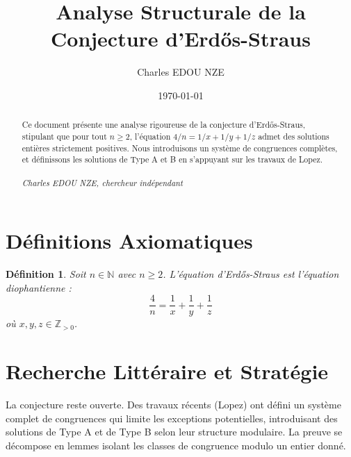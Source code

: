\documentclass[12pt, a4paper]{article}
\title{Analyse Structurale de la Conjecture d'Erdős-Straus}
\author{Charles EDOU NZE}
\date{\today}
\newtheorem{definition}[theorem]{Définition}
\begin{document}
\maketitle

\begin{abstract}
Ce document présente une analyse rigoureuse de la conjecture d'Erdős-Straus, stipulant que pour tout $n \geq 2$, l'équation $4/n = 1/x + 1/y + 1/z$ admet des solutions entières strictement positives. Nous introduisons un système de congruences complètes, et définissons les solutions de Type A et B en s'appuyant sur les travaux de Lopez. \\ \vspace{1cm} \\ \textit{Charles EDOU NZE, chercheur indépendant}
\end{abstract}

\tableofcontents
\newpage

\section{Définitions Axiomatiques}
\begin{definition}
Soit $n \in \mathbb{N}$ avec $n \geq 2$. L'équation d'Erdős-Straus est l'équation diophantienne :
\[\frac{4}{n} = \frac{1}{x} + \frac{1}{y} + \frac{1}{z}\]
où $x, y, z \in \mathbb{Z}_{>0}$.
\end{definition}

\section{Recherche Littéraire et Stratégie}
La conjecture reste ouverte. Des travaux récents (Lopez) ont défini un système complet de congruences qui limite les exceptions potentielles, introduisant des solutions de Type A et de Type B selon leur structure modulaire. La preuve se décompose en lemmes isolant les classes de congruence modulo un entier donné.
\end{document}
